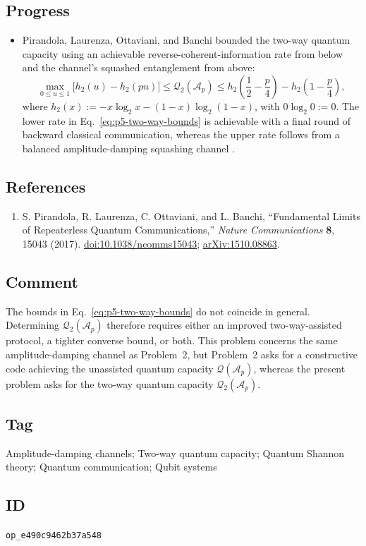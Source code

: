 \subsection*{Progress}

\begin{itemize}
  \item Pirandola, Laurenza, Ottaviani, and Banchi bounded the two-way quantum
  capacity using an achievable reverse-coherent-information rate from below
  and the channel's squashed entanglement from above:
  \begin{equation}
    \max_{0\le u\le1}\bigl[h_2(u)-h_2(pu)\bigr]
    \le \mathcal{Q}_2(\mathcal A_p)
    \le h_2\!\left(\frac12-\frac p4\right)
       -h_2\!\left(1-\frac p4\right),
    \label{eq:p5-two-way-bounds}
  \end{equation}
  where $h_2(x):=-x\log_2x-(1-x)\log_2(1-x)$, with $0\log_2 0:=0$.  The lower rate in
  Eq.~\eqref{eq:p5-two-way-bounds} is achievable with a final round of
  backward classical communication, whereas the upper rate follows from a
  balanced amplitude-damping squashing channel
  .
\end{itemize}

\subsection*{References}

\begin{enumerate}[label={},leftmargin=4.8em,labelsep=0.5em]
  \footnotesize
  \item[\textup{[PLOB17]}]\label{ref:p5-pirandola}
  S. Pirandola, R. Laurenza, C. Ottaviani, and L. Banchi,
  ``Fundamental Limits of Repeaterless Quantum Communications,''
  \emph{Nature Communications} \textbf{8}, 15043 (2017).
  \href{https://doi.org/10.1038/ncomms15043}{doi:10.1038/ncomms15043};
  \href{https://arxiv.org/pdf/1510.08863}{arXiv:1510.08863}.
\end{enumerate}

\subsection*{Comment}

The bounds in Eq.~\eqref{eq:p5-two-way-bounds} do not coincide in general.
Determining $\mathcal{Q}_2(\mathcal A_p)$ therefore requires either an improved
two-way-assisted protocol, a tighter converse bound, or both.
This problem concerns the same amplitude-damping channel as Problem~2, but
Problem~2 asks for a constructive code achieving the unassisted quantum
capacity $\mathcal{Q}(\mathcal A_p)$, whereas the present problem asks for the
two-way quantum capacity $\mathcal{Q}_2(\mathcal A_p)$.

\subsection*{Tag}

Amplitude-damping channels; Two-way quantum capacity; Quantum Shannon theory;
Quantum communication; Qubit systems

\subsection*{ID}

\texttt{op\_e490c9462b37a548}
